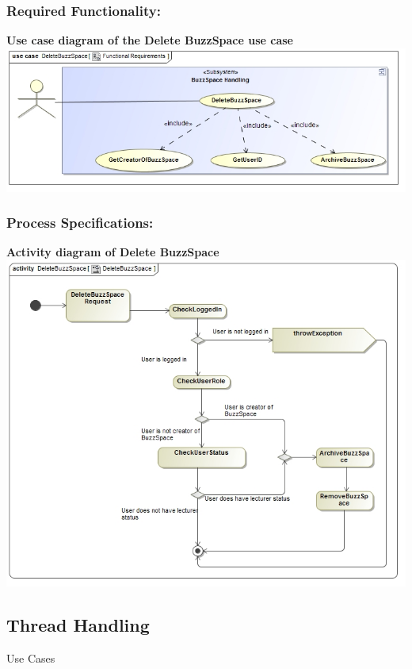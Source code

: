 \documentclass[a4paper,11pt]{article}
\begin{document}
\subsubsection{Required Functionality:} 
\textbf{Use case diagram of the Delete BuzzSpace use case}\\
\includegraphics[width=1\linewidth]{./Images/BuzzSpaceHandling/buzzSpaceDeletion.jpg}\\
\subsubsection{Process Specifications:} 
\textbf{Activity diagram of Delete BuzzSpace}\\ 
\includegraphics[width=1\linewidth]{./Images/BuzzSpaceHandling/buzzSpaceDeleteAct.jpg}\\

\begin{center}
\section{\textbf{\huge{Thread Handling}}}

\Large{Use Cases}
\end{center}
\end{document}
